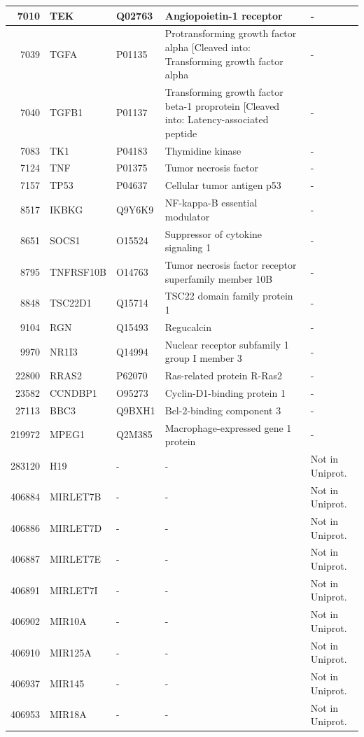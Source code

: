 \documentclass[
]{article}
\begin{document}
\begin{table}[H]
\begin{tabular}[t]{r|l|l|l|l}
\hline
7010 & TEK & Q02763 & Angiopoietin-1 receptor & -\\
\hline
7039 & TGFA & P01135 & Protransforming growth factor alpha [Cleaved into: Transforming growth factor alpha & -\\
\hline
7040 & TGFB1 & P01137 & Transforming growth factor beta-1 proprotein [Cleaved into: Latency-associated peptide & -\\
\hline
7083 & TK1 & P04183 & Thymidine kinase & -\\
\hline
7124 & TNF & P01375 & Tumor necrosis factor & -\\
\hline
7157 & TP53 & P04637 & Cellular tumor antigen p53 & -\\
\hline
8517 & IKBKG & Q9Y6K9 & NF-kappa-B essential modulator & -\\
\hline
8651 & SOCS1 & O15524 & Suppressor of cytokine signaling 1 & -\\
\hline
8795 & TNFRSF10B & O14763 & Tumor necrosis factor receptor superfamily member 10B & -\\
\hline
8848 & TSC22D1 & Q15714 & TSC22 domain family protein 1 & -\\
\hline
9104 & RGN & Q15493 & Regucalcin & -\\
\hline
9970 & NR1I3 & Q14994 & Nuclear receptor subfamily 1 group I member 3 & -\\
\hline
22800 & RRAS2 & P62070 & Ras-related protein R-Ras2 & -\\
\hline
23582 & CCNDBP1 & O95273 & Cyclin-D1-binding protein 1 & -\\
\hline
27113 & BBC3 & Q9BXH1 & Bcl-2-binding component 3 & -\\
\hline
219972 & MPEG1 & Q2M385 & Macrophage-expressed gene 1 protein & -\\
\hline
283120 & H19 & - & - & Not in Uniprot.\\
\hline
406884 & MIRLET7B & - & - & Not in Uniprot.\\
\hline
406886 & MIRLET7D & - & - & Not in Uniprot.\\
\hline
406887 & MIRLET7E & - & - & Not in Uniprot.\\
\hline
406891 & MIRLET7I & - & - & Not in Uniprot.\\
\hline
406902 & MIR10A & - & - & Not in Uniprot.\\
\hline
406910 & MIR125A & - & - & Not in Uniprot.\\
\hline
406937 & MIR145 & - & - & Not in Uniprot.\\
\hline
406953 & MIR18A & - & - & Not in Uniprot.\\

\end{tabular}
\end{table}
\end{document}
